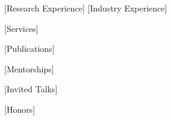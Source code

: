 \newcommand{\EducationItem}{\resumeSubheading}

\newcommand{\InterestItem}{\resumeSubheading}

[Research Experience]
[Industry Experience]
\newcommand{\ExperienceItem}{\resumeSubheading}

[Services]
\newcommand{\ServiceItem}{\resumeSubheading}

\newcommand{\TeachingItem}{\resumeSubheading}

[Publications]
\newenvironment{PublicationList}[1]
{
    \begin{enumerate}[leftmargin=3em,label={\small[#1\arabic*]},topsep=0pt,itemsep=1pt,topsep=2pt,parsep=0pt,partopsep=0pt]
}
{
    \end{enumerate}
    \vspace{\SectionPadding}
}
\newcommand{\PublicationItem}[4]{
    \item \small \label{pub:#1} {#4}. {#2}, \textit{#3}
}
\newcommand{\PublicationItemOngoing}[4]{
    \item \small \label{pub:#1} {#4}. {#2}
}

[Mentorships]
\newcommand{\MentorshipItem}{\resumeSubheading}

[Invited Talks]
\newcommand{\TalkItem}{\resumeTalks}

[Honors]
\newcommand{\HonorItem}{}

\newenvironment{SectionTable}
    {\begin{tabular*}{\ItemTableWidth}{l@{\extracolsep{4em}}l}}
    {\end{tabular*}}
\newenvironment{Reference}
    {\section{References}\begin{SectionTable}}
    {\end{SectionTable}}
\newcommand{\ReferenceItem}[2]{\textbf{#1} & #2 \\}
